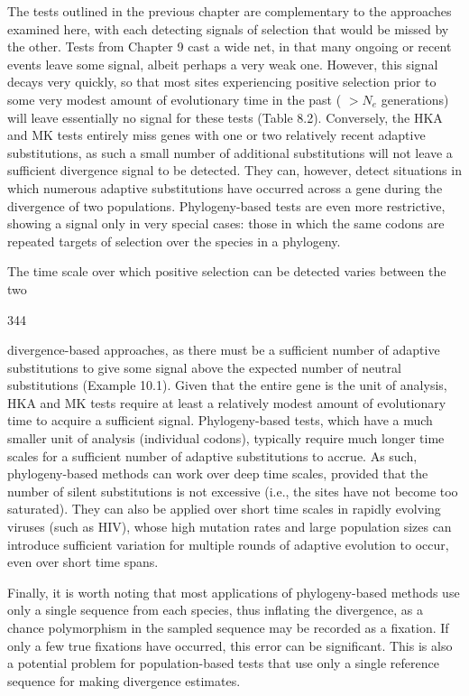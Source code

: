 \documentclass{article}
\begin{document}
The tests outlined in the previous chapter are complementary to the approaches examined here, with each detecting signals of selection that would be missed by the other. Tests from Chapter 9 cast a wide net, in that many ongoing or recent events leave some signal, albeit perhaps a very weak one. However, this signal decays very quickly, so that most sites experiencing positive selection prior to some very modest amount of evolutionary time in the past ( $ >N_{e} $ generations) will leave essentially no signal for these tests (Table 8.2). Conversely, the HKA and MK tests entirely miss genes with one or two relatively recent adaptive substitutions, as such a small number of additional substitutions will not leave a sufficient divergence signal to be detected. They can, however, detect situations in which numerous adaptive substitutions have occurred across a gene during the divergence of two populations. Phylogeny-based tests are even more restrictive, showing a signal only in very special cases: those in which the same codons are repeated targets of selection over the species in a phylogeny.

The time scale over which positive selection can be detected varies between the two

344

divergence-based approaches, as there must be a sufficient number of adaptive substitutions to give some signal above the expected number of neutral substitutions (Example 10.1). Given that the entire gene is the unit of analysis, HKA and MK tests require at least a relatively modest amount of evolutionary time to acquire a sufficient signal. Phylogeny-based tests, which have a much smaller unit of analysis (individual codons), typically require much longer time scales for a sufficient number of adaptive substitutions to accrue. As such, phylogeny-based methods can work over deep time scales, provided that the number of silent substitutions is not excessive (i.e., the sites have not become too saturated). They can also be applied over short time scales in rapidly evolving viruses (such as HIV), whose high mutation rates and large population sizes can introduce sufficient variation for multiple rounds of adaptive evolution to occur, even over short time spans.

Finally, it is worth noting that most applications of phylogeny-based methods use only a single sequence from each species, thus inflating the divergence, as a chance polymorphism in the sampled sequence may be recorded as a fixation. If only a few true fixations have occurred, this error can be significant. This is also a potential problem for population-based tests that use only a single reference sequence for making divergence estimates.
\end{document}
